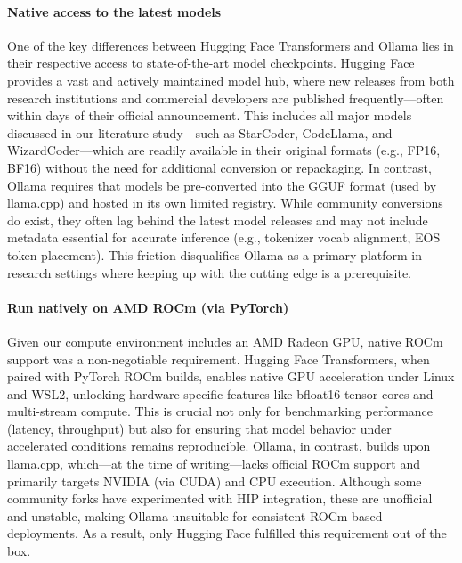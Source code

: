 \paragraph{Native access to the latest models}
One of the key differences between Hugging Face Transformers and Ollama lies in their respective access to state-of-the-art model checkpoints. Hugging Face provides a vast and actively maintained model hub, where new releases from both research institutions and commercial developers are published frequently---often within days of their official announcement. This includes all major models discussed in our literature study---such as StarCoder, CodeLlama, and WizardCoder---which are readily available in their original formats (e.g., FP16, BF16) without the need for additional conversion or repackaging. In contrast, Ollama requires that models be pre-converted into the GGUF format (used by llama.cpp) and hosted in its own limited registry. While community conversions do exist, they often lag behind the latest model releases and may not include metadata essential for accurate inference (e.g., tokenizer vocab alignment, EOS token placement). This friction disqualifies Ollama as a primary platform in research settings where keeping up with the cutting edge is a prerequisite.

\paragraph{Run natively on AMD ROCm (via PyTorch)}
Given our compute environment includes an AMD Radeon GPU, native ROCm support was a non-negotiable requirement. Hugging Face Transformers, when paired with PyTorch ROCm builds, enables native GPU acceleration under Linux and WSL2, unlocking hardware-specific features like bfloat16 tensor cores and multi-stream compute. This is crucial not only for benchmarking performance (latency, throughput) but also for ensuring that model behavior under accelerated conditions remains reproducible. Ollama, in contrast, builds upon llama.cpp, which---at the time of writing---lacks official ROCm support and primarily targets NVIDIA (via CUDA) and CPU execution. Although some community forks have experimented with HIP integration, these are unofficial and unstable, making Ollama unsuitable for consistent ROCm-based deployments. As a result, only Hugging Face fulfilled this requirement out of the box.

